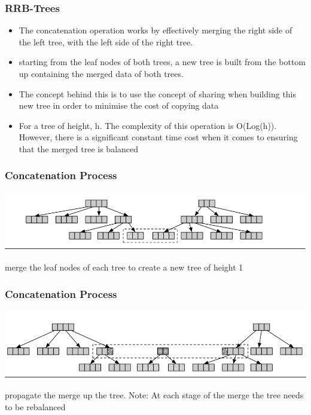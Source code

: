 \documentclass{beamer}
\begin{document}
 
\begin{frame}
\frametitle{RRB-Trees}

	\begin{itemize}
	
		\item The concatenation operation works by effectively merging the right side of the left tree, with the left side of the right tree. 
		\item starting from the leaf nodes of both trees, a new tree is built from the bottom up containing the merged data of both trees.
		\item The concept behind this is to use the concept of sharing when building this new tree in order to minimise the cost of copying data
		\item For a tree of height, h. The complexity of this operation is O(Log(h)). However, there is a significant constant time cost when it comes to ensuring that the merged tree is balanced
	
	\end{itemize}

\end{frame}
 
 
\begin{frame}
\frametitle{Concatenation Process}

	\begin{center}
	
	\includegraphics[scale=0.3]{concat1.png}
	
	\end{center}
	
	merge the leaf nodes of each tree to create a new tree of height 1

\end{frame}

\begin{frame}
\frametitle{Concatenation Process}

	\begin{center}
	
	\includegraphics[scale=0.3]{concat2.png}
	
	\end{center}
	
	propagate the merge up the tree. Note: At each stage of the merge the tree needs to be rebalanced

\end{frame}
\end{document}
